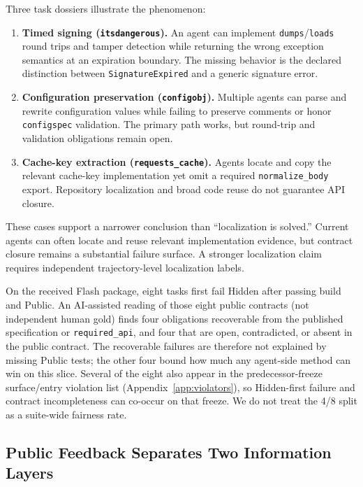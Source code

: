 \documentclass[acmsmall,anonymous,review,screen]{acmart}
\begin{document}
Three task dossiers illustrate the phenomenon:
\begin{enumerate}
  \item \textbf{Timed signing (\texttt{itsdangerous}).} An agent can implement
        \texttt{dumps}/\texttt{loads} round trips and tamper detection while
        returning the wrong exception semantics at an expiration boundary.
        The missing behavior is the declared distinction between
        \texttt{SignatureExpired} and a generic signature error.
  \item \textbf{Configuration preservation (\texttt{configobj}).} Multiple
        agents can parse and rewrite configuration values while failing to
        preserve comments or honor \texttt{configspec} validation. The primary
        path works, but round-trip and validation obligations remain open.
  \item \textbf{Cache-key extraction (\texttt{requests\_cache}).} Agents locate
        and copy the relevant cache-key implementation yet omit a required
        \texttt{normalize\_body} export. Repository localization and broad code
        reuse do not guarantee API closure.
\end{enumerate}

These cases support a narrower conclusion than ``localization is solved.''
Current agents can often locate and reuse relevant implementation evidence,
but contract closure remains a substantial failure surface. A stronger
localization claim requires independent trajectory-level localization labels.

On the received Flash package, eight tasks first fail Hidden after passing
build and Public. An AI-assisted reading of those eight public contracts
(not independent human gold) finds four obligations recoverable from the
published specification or \texttt{required\_api}, and four that are
open, contradicted, or absent in the public contract. The recoverable
failures are therefore not explained by missing Public tests; the other four
bound how much any agent-side method can win on this slice. Several of the
eight also appear in the predecessor-freeze surface/entry violation list
(Appendix~\ref{app:violators}), so Hidden-first failure and contract
incompleteness can co-occur on that freeze. We do not treat the 4/8 split as a suite-wide
fairness rate.

\subsection{Public Feedback Separates Two Information Layers}
\end{document}
